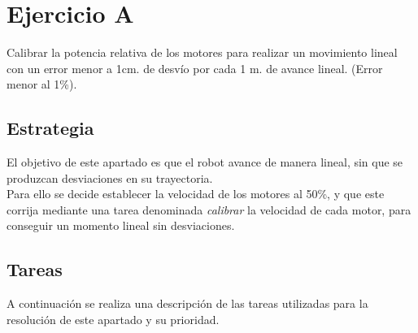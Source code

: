\section{Ejercicio A}
Calibrar la potencia relativa de los motores para realizar un movimiento lineal con un error menor a 1cm. de desvío por cada 1 m. de avance lineal. (Error menor al 1\%).

\subsection{Estrategia}
El objetivo de este apartado es que el robot avance de manera lineal, sin que se produzcan desviaciones en su trayectoria. \\

Para ello se decide establecer la velocidad de los motores al 50\%, y que este corrija mediante una tarea denominada \textit{calibrar} la velocidad de cada motor, para conseguir un momento lineal sin desviaciones.


\subsection{Tareas}
A continuación se realiza una descripción de las tareas utilizadas para la resolución de este apartado y su prioridad.

